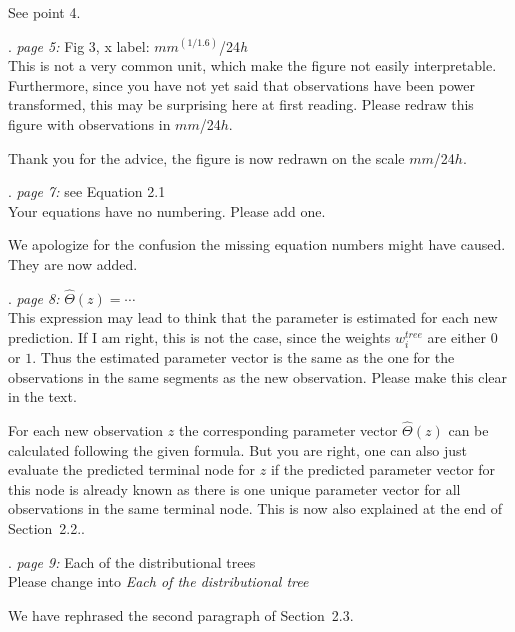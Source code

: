 \documentclass[american,foldmarks=false,noconfig]{uibklttr}
\newenvironment{review}{\fontshape{\itdefault}\fontseries{\bfdefault} \selectfont \smallskip}{\par}
\begin{document}
See point 4.

\begin{review}
6. {\color{quotecolor}\textit{page 5:} Fig 3, x label: $mm^{(1/1.6)}$/24\textit{h}}\\
This is not a very common unit, which make the figure not easily 
interpretable. Furthermore, since you have not yet said that 
observations have been power transformed, this may be surprising 
here at first reading. Please redraw this figure with 
observations in $mm$/24$h$.
\end{review}

Thank you for the advice, the figure is now redrawn on the scale $mm$/24$h$.


\begin{review}
7. {\color{quotecolor}\textit{page 7:} see Equation 2.1}\\
Your equations have no numbering. Please add one.
\end{review}

We apologize for the confusion the missing equation numbers 
might have caused. They are now added.

\begin{review}
8. {\color{quotecolor}\textit{page 8:} $\hat{\Theta}(z) = \cdots$}\\
This expression may lead to think that the parameter is estimated 
for each new prediction. If I am right, this is not the case, 
since the weights $w_i^{tree}$ are either $0$ or $1$. Thus the 
estimated parameter vector is the same as the one for the 
observations in the same segments as the new observation.
Please make this clear in the text.
\end{review}

For each new observation $z$ the corresponding 
parameter vector $\hat{\Theta}(z)$ can be calculated following 
the given formula. But you are right, one can also just evaluate 
the predicted terminal node for $z$ if the predicted parameter
vector for this node is already known as there is one unique 
parameter vector for all observations in the same terminal node.
This is now also explained at the end of Section~2.2..


\begin{review}
9. {\color{quotecolor}\textit{page 9:} Each of the distributional trees}\\
Please change into \textit{Each of the distributional tree}
\end{review}

We have rephrased the second paragraph of Section~2.3.
\end{document}
